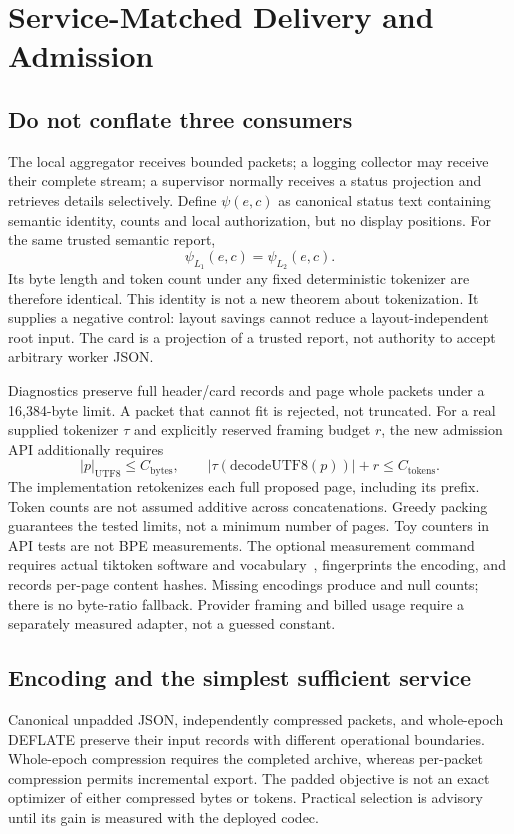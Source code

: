\section{Service-Matched Delivery and Admission}\label{sec:delivery}
\subsection{Do not conflate three consumers}\label{sec:consumers}
The local aggregator receives bounded packets; a logging collector may receive
their complete stream; a supervisor normally receives a status projection and
retrieves details selectively. Define $\psi(e,c)$ as canonical status text
containing semantic identity, counts and local authorization, but no display
positions. For the same trusted semantic report,
\begin{equation}\psi_{L_1}(e,c)=\psi_{L_2}(e,c).\label{eq:rootid}\end{equation}
Its byte length and token count under any fixed deterministic tokenizer are
therefore identical. This identity is not a new theorem about tokenization. It
supplies a negative control: layout savings cannot reduce a layout-independent
root input. The card is a projection of a trusted report, not authority to accept
arbitrary worker JSON.

Diagnostics preserve full header/card records and page whole packets under a
16{,}384-byte limit. A packet that cannot fit is rejected, not truncated. For a
real supplied tokenizer $\tau$ and explicitly reserved framing budget $r$, the
new admission API additionally requires
\begin{equation}|p|_{\mathrm{UTF8}}\le C_{\text{bytes}},\qquad |\tau(\mathrm{decodeUTF8}(p))|+r\le C_{\text{tokens}}.\label{eq:admit}\end{equation}
The implementation retokenizes each full proposed page, including its prefix.
Token counts are not assumed additive across concatenations. Greedy packing
guarantees the tested limits, not a minimum number of pages. Toy counters in API
tests are not BPE measurements. The optional measurement command requires actual
tiktoken software and vocabulary~\cite{tiktoken}, fingerprints the encoding, and
records per-page content hashes. Missing encodings produce \UNKNOWN{} and null
counts; there is no byte-ratio fallback. Provider framing and billed usage
require a separately measured adapter, not a guessed constant.

\subsection{Encoding and the simplest sufficient service}\label{sec:encoding}
Canonical unpadded JSON, independently compressed packets, and whole-epoch
DEFLATE preserve their input records with different operational boundaries.
Whole-epoch compression requires the completed archive, whereas per-packet
compression permits incremental export. The padded objective is not an exact
optimizer of either compressed bytes or tokens. Practical selection is advisory
until its gain is measured with the deployed codec.

